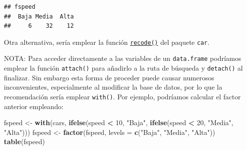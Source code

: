 \documentclass[
]{book}
\newenvironment{Shaded}{\begin{snugshade}}{\end{snugshade}}
\newcommand{\AttributeTok}[1]{\textcolor[rgb]{0.13,0.29,0.53}{#1}}
\newcommand{\DecValTok}[1]{\textcolor[rgb]{0.00,0.00,0.81}{#1}}
\newcommand{\FunctionTok}[1]{\textcolor[rgb]{0.13,0.29,0.53}{\textbf{#1}}}
\newcommand{\NormalTok}[1]{#1}
\newcommand{\OtherTok}[1]{\textcolor[rgb]{0.56,0.35,0.01}{#1}}
\newcommand{\SpecialCharTok}[1]{\textcolor[rgb]{0.81,0.36,0.00}{\textbf{#1}}}
\newcommand{\StringTok}[1]{\textcolor[rgb]{0.31,0.60,0.02}{#1}}
\begin{document}
\begin{verbatim}
## fspeed
##  Baja Media  Alta 
##     6    32    12
\end{verbatim}

Otra alternativa, sería emplear la función \href{https://www.rdocumentation.org/packages/car/versions/3.0-9/topics/recode}{\texttt{recode()}} del paquete \texttt{car}.

\begin{Shaded}
\end{Shaded}

NOTA: Para acceder directamente a las variables de un \texttt{data.frame} podríamos emplear la función \texttt{attach()} para añadirlo a la ruta de búsqueda y \texttt{detach()} al finalizar.
Sin embargo esta forma de proceder puede causar numerosos inconvenientes, especialmente al modificar la base de datos, por lo que la recomendación sería emplear \texttt{with()}.
Por ejemplo, podríamos calcular el factor anterior empleando:

\begin{Shaded}
\begin{Highlighting}[]
\NormalTok{fspeed }\OtherTok{\textless{}{-}} \FunctionTok{with}\NormalTok{(cars, }\FunctionTok{ifelse}\NormalTok{(speed }\SpecialCharTok{\textless{}} \DecValTok{10}\NormalTok{, }\StringTok{"Baja"}\NormalTok{,}
                 \FunctionTok{ifelse}\NormalTok{(speed }\SpecialCharTok{\textless{}} \DecValTok{20}\NormalTok{, }\StringTok{"Media"}\NormalTok{, }\StringTok{"Alta"}\NormalTok{)))}
\NormalTok{fspeed }\OtherTok{\textless{}{-}} \FunctionTok{factor}\NormalTok{(fspeed, }\AttributeTok{levels =} \FunctionTok{c}\NormalTok{(}\StringTok{"Baja"}\NormalTok{, }\StringTok{"Media"}\NormalTok{, }\StringTok{"Alta"}\NormalTok{))}
\FunctionTok{table}\NormalTok{(fspeed)}
\end{Highlighting}
\end{Shaded}
\end{document}

